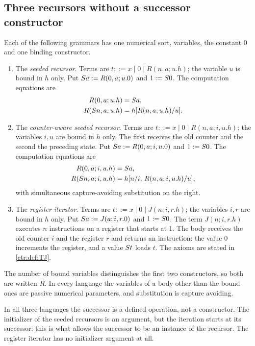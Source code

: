 \subsection{Three recursors without a successor constructor}

\begin{definition}\label{ctr:def:languages}
Each of the following grammars has one numerical sort, variables, the constant $0$ and one
binding constructor.
\begin{enumerate}
\item The \emph{seeded recursor}. Terms are $t ::= x \mid 0 \mid R(n,a;u.h)$; the variable $u$
is bound in $h$ only. Put $S a \mathrel{:=} R(0,a;u.0)$ and $1 \mathrel{:=} S 0$. The computation
equations are
\begin{align}
 R(0,a;u.h) &= S a, \label{ctr:eq:r1zero}\\
 R(S n,a;u.h) &= h[R(n,a;u.h)/u]. \label{ctr:eq:r1succ}
\end{align}
\item The \emph{counter-aware seeded recursor}. Terms are
$t ::= x \mid 0 \mid R(n,a;i,u.h)$; the variables $i,u$ are bound in $h$ only. The first
receives the old counter and the second the preceding state. Put
$S a \mathrel{:=} R(0,a;i,u.0)$ and $1 \mathrel{:=} S 0$. The computation equations are
\begin{align}
 R(0,a;i,u.h) &= S a, \label{ctr:eq:r2zero}\\
 R(S n,a;i,u.h) &= h[n/i,\,R(n,a;i,u.h)/u], \label{ctr:eq:r2succ}
\end{align}
with simultaneous capture-avoiding substitution on the right.
\item The \emph{register iterator}. Terms are $t ::= x \mid 0 \mid J(n;i,r.h)$; the variables
$i,r$ are bound in $h$ only. Put $S a \mathrel{:=} J(a;i,r.0)$ and $1\mathrel{:=} S 0$. The term
$J(n;i,r.h)$ executes $n$ instructions on a register that starts at $1$. The body receives
the old counter $i$ and the register $r$ and returns an instruction: the value $0$ increments
the register, and a value $S t$ loads $t$. The axioms are stated in \cref{ctr:def:TJ}.
\end{enumerate}
The number of bound variables distinguishes the first two constructors, so both are written
$R$. In every language the variables of a body other than the bound ones are passive
numerical parameters, and substitution is capture avoiding.
\end{definition}

In all three languages the successor is a defined operation, not a constructor. The
initializer of the seeded recursors is an argument, but the iteration starts at its
successor; this is what allows the successor to be an instance of the recursor. The register
iterator has no initializer argument at all.

